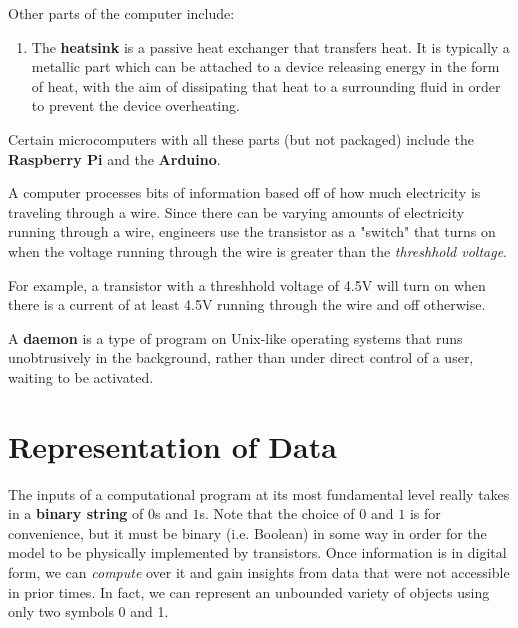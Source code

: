 \documentclass{article}
\begin{document}
  \begin{definition}
  Other parts of the computer include: 
  \begin{enumerate}
      \item The \textbf{heatsink} is a passive heat exchanger that transfers heat. It is typically a metallic part which can be attached to a device releasing energy in the form of heat, with the aim of dissipating that heat to a surrounding fluid in order to prevent the device overheating. 
  \end{enumerate}
  \end{definition}

  Certain microcomputers with all these parts (but not packaged) include the \textbf{Raspberry Pi} and the \textbf{Arduino}. 

  \begin{definition}
  A computer processes bits of information based off of how much electricity is traveling through a wire. Since there can be varying amounts of electricity running through a wire, engineers use the transistor as a "switch" that turns on when the voltage running through the wire is greater than the \textit{threshhold voltage}. 
  \end{definition}

  For example, a transistor with a threshhold voltage of 4.5V will turn on when there is a current of at least 4.5V running through the wire and off otherwise. 

  \begin{definition}
  A \textbf{daemon} is a type of program on Unix-like operating systems that runs unobtrusively in the background, rather than under direct control of a user, waiting to be activated. 
  \end{definition}

\section{Representation of Data}

  The inputs of a computational program at its most fundamental level really takes in a \textbf{binary string} of $0$s and $1$s. Note that the choice of $0$ and $1$ is for convenience, but it must be binary (i.e. Boolean) in some way in order for the model to be physically implemented by transistors. Once information is in digital form, we can \textit{compute} over it and gain insights from data that were not accessible in prior times. In fact, we can represent an unbounded variety of objects using only two symbols 0 and 1. 
\end{document}
